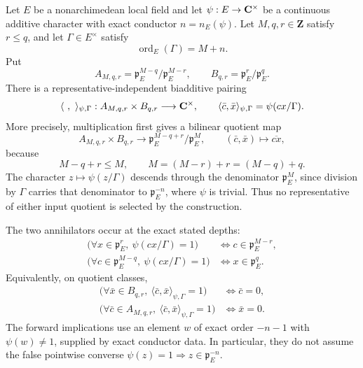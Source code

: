 \begin{theorem}\label{mod:lamprecht-finiteduality}
Let $E$ be a nonarchimedean local field and let
$\psi:E\to\mathbf C^\times$ be a continuous additive character with exact
conductor $n=n_E(\psi)$.  Let $M,q,r\in\mathbf Z$ satisfy $r\le q$, and
let $\Gamma\in E^\times$ satisfy
\[
 \operatorname{ord}_E(\Gamma)=M+n.
\]
Put
\[
 A_{M,q,r}=\mathfrak p_E^{M-q}/\mathfrak p_E^{M-r},
 \qquad
 B_{q,r}=\mathfrak p_E^r/\mathfrak p_E^q.
\]
There is a representative-independent biadditive pairing
\begin{equation}\label{eq:blueprint-general-stationary-pairing}
 \langle\ ,\ \rangle_{\psi,\Gamma}:
 A_{M,q,r}\times B_{q,r}\longrightarrow\mathbf C^\times,
 \qquad
 \langle\bar c,\bar x\rangle_{\psi,\Gamma}
   =\psi(cx/\Gamma).
\end{equation}
More precisely, multiplication first gives a bilinear quotient map
\[
 A_{M,q,r}\times B_{q,r}
 \longrightarrow
 \mathfrak p_E^{M-q+r}/\mathfrak p_E^M,
 \qquad (\bar c,\bar x)\longmapsto\overline{cx},
\]
because
\[
 M-q+r\le M,
 \qquad M=(M-r)+r=(M-q)+q.
\]
The character $z\mapsto\psi(z/\Gamma)$ descends through the denominator
$\mathfrak p_E^M$, since division by $\Gamma$ carries that denominator to
$\mathfrak p_E^{-n}$, where $\psi$ is trivial.  Thus no representative of
either input quotient is selected by the construction.

The two annihilators occur at the exact stated depths:
\[
 \begin{aligned}
  \bigl(\forall x\in\mathfrak p_E^r,
     \ \psi(cx/\Gamma)=1\bigr)
    &\Longleftrightarrow c\in\mathfrak p_E^{M-r},\\
  \bigl(\forall c\in\mathfrak p_E^{M-q},
     \ \psi(cx/\Gamma)=1\bigr)
    &\Longleftrightarrow x\in\mathfrak p_E^q.
 \end{aligned}
\]
Equivalently, on quotient classes,
\[
 \begin{aligned}
  \bigl(\forall\bar x\in B_{q,r},
    \ \langle\bar c,\bar x\rangle_{\psi,\Gamma}=1\bigr)
    &\Longleftrightarrow\bar c=0,\\
  \bigl(\forall\bar c\in A_{M,q,r},
    \ \langle\bar c,\bar x\rangle_{\psi,\Gamma}=1\bigr)
    &\Longleftrightarrow\bar x=0.
 \end{aligned}
\]
The forward implications use an element $w$ of exact order $-n-1$ with
$\psi(w)\ne1$, supplied by exact conductor data.  In particular, they do
not assume the false pointwise converse
$\psi(z)=1\Rightarrow z\in\mathfrak p_E^{-n}$.


\end{theorem}
